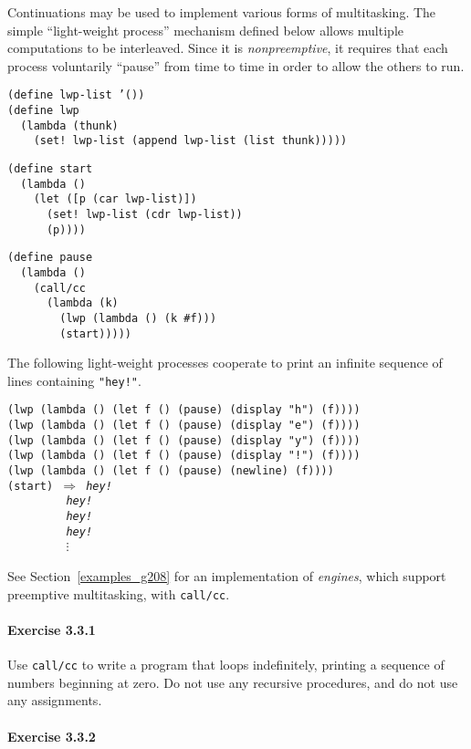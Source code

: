 Continuations may be used to implement various forms of multitasking.
The simple ``light-weight process'' mechanism defined below allows
multiple computations to be interleaved.
Since it is \textit{nonpreemptive}, it requires that each process voluntarily
``pause'' from time to time in order to allow the others to run.


\begin{alltt}
(define lwp-list '())
(define lwp
  (lambda (thunk)
    (set! lwp-list (append lwp-list (list thunk)))))

(define start
  (lambda ()
    (let ([p (car lwp-list)])
      (set! lwp-list (cdr lwp-list))
      (p))))
\end{alltt}


\begin{alltt}
(define pause
  (lambda ()
    (call/cc
      (lambda (k)
        (lwp (lambda () (k \#{}f)))
        (start)))))
\end{alltt}


The following light-weight processes cooperate to print an
infinite sequence of lines containing \texttt{"hey!"}.


\begin{alltt}
(lwp (lambda () (let f () (pause) (display "h") (f))))
(lwp (lambda () (let f () (pause) (display "e") (f))))
(lwp (lambda () (let f () (pause) (display "y") (f))))
(lwp (lambda () (let f () (pause) (display "!") (f))))
(lwp (lambda () (let f () (pause) (newline) (f))))
(start) \(\Rightarrow\) \textit{hey!}
         \textit{hey!}
         \textit{hey!}
         \textit{hey!}
         \(\vdots\)
\end{alltt}


See Section \ref{examples_g208} for an implementation of \textit{engines},
which support preemptive multitasking, with \texttt{call/cc}.


\paragraph{Exercise \label{further_g70}3.3.1}


\label{further_s66}Use \texttt{call/cc} to write a program that loops indefinitely, printing
a sequence of numbers beginning at zero.
Do not use any recursive procedures, and do not use any assignments.




\paragraph{Exercise \label{further_g71}3.3.2}


